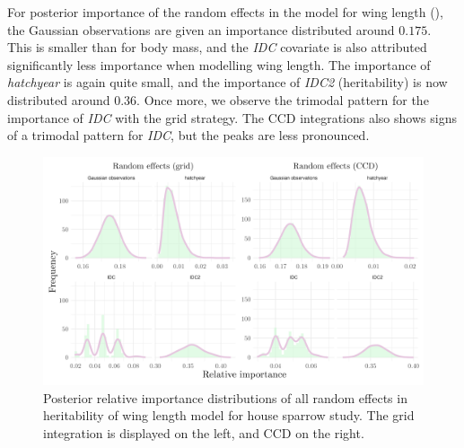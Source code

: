 For posterior importance of the random effects in the model for wing length (), the Gaussian observations are given an importance distributed around $0.175$. This is smaller than for body mass, and the \textit{IDC} covariate is also attributed significantly less importance when modelling wing length. The importance of \textit{hatchyear} is again quite small, and the importance of \textit{IDC2} (heritability) is now distributed around $0.36$. Once more, we observe the trimodal pattern for the importance of \textit{IDC} with the grid strategy. The CCD integrations also shows signs of a trimodal pattern for \textit{IDC}, but the peaks are less pronounced. 
\begin{figure}[H]%
  \centering
  \includegraphics[width=1\linewidth]{Figures/House sparrow study/Wing_random.png}
  \caption[Posterior relative importance distributions of all random effects in wing length model for house sparrow study]{Posterior relative importance distributions of all random effects in heritability of wing length model for house sparrow study. The grid integration is displayed on the left, and CCD on the right.}
  \label{fig:wing_random_sparrows}
\end{figure}

